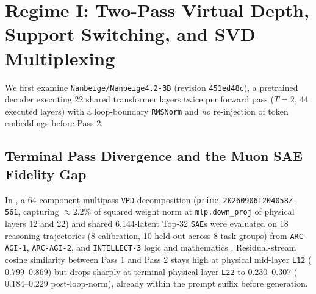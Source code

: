 \documentclass[10pt,letterpaper]{article}
\begin{document}
\section{Regime I: Two-Pass Virtual Depth, Support Switching, and SVD Multiplexing}\label{sec:regime1}

We first examine \texttt{Nanbeige/Nanbeige4.2-3B} \cite{nanbeige2026model} (revision \texttt{451ed48c}), a pretrained decoder executing 22 shared transformer layers twice per forward pass ($T=2$, 44 executed layers) with a loop-boundary \texttt{RMSNorm} and \emph{no} re-injection of token embeddings before Pass 2.

\subsection{Terminal Pass Divergence and the Muon SAE Fidelity Gap}

In \cite{dugan2026vpd}, a 64-component multipass \texttt{VPD} decomposition (\texttt{prime-20260906T204058Z-561}, capturing $\approx 2.2\%$ of squared weight norm at \texttt{mlp.down\_proj} of physical layers 12 and 22) and shared 6,144-latent Top-32 \texttt{SAE}s were evaluated on 18 reasoning trajectories (8 calibration, 10 held-out across 8 task groups) from \texttt{ARC-AGI-1}, \texttt{ARC-AGI-2}, and \texttt{INTELLECT-3} logic and mathematics \cite{primeintellect2025intellect3}. Residual-stream cosine similarity between Pass 1 and Pass 2 stays high at physical mid-layer \texttt{L12} ($0.799$--$0.869$) but drops sharply at terminal physical layer \texttt{L22} to $0.230$--$0.307$ ($0.184$--$0.229$ post-loop-norm), already within the prompt suffix before generation.
\end{document}
